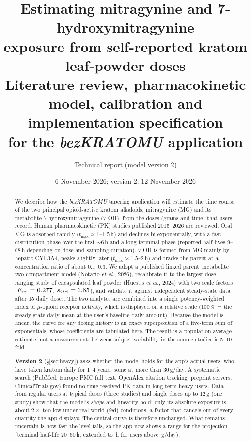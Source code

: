 \documentclass[10pt,a4paper]{article}
\title{\textbf{Estimating mitragynine and 7-hydroxymitragynine\\exposure from self-reported kratom leaf-powder doses}\\[4pt]
\large Literature review, pharmacokinetic model, calibration and implementation specification\\for the \emph{bezKRATOMU} application}
\author{Technical report (model version 2)}
\date{6 November 2026; version 2: 12 November 2026}
\newcommand{\OH}{\mathrm{OH}}
\begin{document}
\maketitle

\begin{abstract}
\noindent
We describe how the \emph{bezKRATOMU} tapering application will estimate the time course of the two
principal opioid-active kratom alkaloids, mitragynine (MG) and its metabolite 7-hydroxymitragynine (7-OH),
from the doses (grams and time) that users record. Human pharmacokinetic (PK) studies published
2015--2026 are reviewed. Oral MG is absorbed rapidly ($t_{\max}\approx 1$--$1.5$\,h) and declines
bi-exponentially, with a fast distribution phase over the first $\sim$6\,h and a long terminal phase
(reported half-lives 9--68\,h depending on dose and sampling duration). 7-OH is formed from MG mainly by hepatic CYP3A4,
peaks slightly later ($t_{\max}\approx 1.5$--$2$\,h) and tracks the parent at a concentration ratio of about 0.1--0.3.
We adopt a published linked parent--metabolite two-compartment model (Notario \emph{et al.}, 2026),
recalibrate it to the largest dose-ranging study of encapsulated leaf powder (Huestis \emph{et al.}, 2024)
with two scale factors ($F_{\mathrm{rel}}=0.277$, $s_{\OH}=\nSoh$), and validate it against independent
steady-state data after 15 daily doses. The two analytes are combined into a single
potency-weighted index of $\mu$-opioid receptor activity, which is displayed on a relative scale
(100\,\% = the steady-state daily mean at the user's baseline daily amount). Because the model is linear,
the curve for any dosing history is an exact superposition of a five-term sum of exponentials,
whose coefficients are tabulated here. The result is a population-average estimate, not a measurement:
between-subject variability in the source studies is 5--10-fold.

\smallskip\noindent
\textbf{Version 2} (\S\ref{sec:heavy}) asks whether the model holds for the app's actual users, who have taken kratom
daily for 1--4 years, some at more than 30\,g/day. A systematic search (PubMed, Europe PMC full text, OpenAlex citation
tracking, preprint servers, ClinicalTrials.gov) found no time-resolved PK data in long-term heavy users. Data from regular users
at typical doses (three studies) and single doses up to 12\,g (one study) show that the model's \emph{shape} and linearity hold;
only its absolute exposure is about $2\times$ too low under real-world (fed) conditions, a factor that cancels out of every
quantity the app displays. The central curve is therefore unchanged. What remains uncertain is how fast the level falls, so the
app now shows a range for the projection (terminal half-life 20--60\,h, extended to \ntslowheavy\,h for users above
\nheavyg\,g/day).
\end{abstract}
\end{document}
